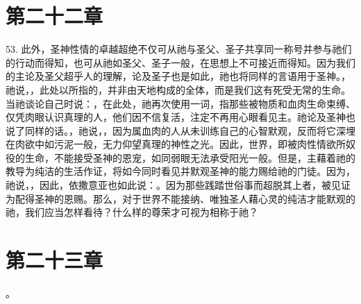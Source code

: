\section{第二十二章}

\par

53. 此外，圣神性情的卓越超绝不仅可从祂与圣父、圣子共享同一称号并参与祂们的行动而得知，也可从祂如圣父、圣子一般，在思想上不可接近而得知。因为我们的主论及圣父超乎人的理解，论及圣子也是如此，祂也将同样的言语用于圣神。，祂说，，此处以所指的，并非由天地构成的全体，而是我们这有死受无常的生命。当祂谈论自己时说：，在此处，祂再次使用一词，指那些被物质和血肉生命束缚、仅凭肉眼认识真理的人，他们因不信复活，注定不再用心眼看见主。祂论及圣神也说了同样的话。，祂说，，因为属血肉的人从未训练自己的心智默观，反而将它深埋在肉欲中如污泥一般，无力仰望真理的神性之光。因此，世界，即被肉性情欲所奴役的生命，不能接受圣神的恩宠，如同弱眼无法承受阳光一般。但是，主藉着祂的教导为纯洁的生活作证，将如今同时看见并默观圣神的能力赐给祂的门徒。因为，祂说，，因此，依撒意亚也如此说：。因为那些践踏世俗事而超脱其上者，被见证为配得圣神的恩赐。那么，对于世界不能接纳、唯独圣人藉心灵的纯洁才能默观的祂，我们应当怎样看待？什么样的尊荣才可视为相称于祂？\par


\section{第二十三章}

。\par

